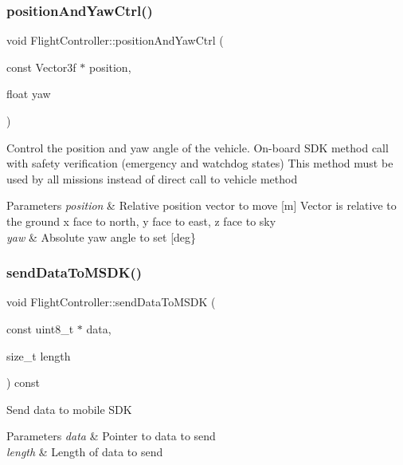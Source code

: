\subsubsection{\texorpdfstring{position\+And\+Yaw\+Ctrl()}{positionAndYawCtrl()}}
{\footnotesize\ttfamily void Flight\+Controller\+::position\+And\+Yaw\+Ctrl (\begin{DoxyParamCaption}\item[{const Vector3f $\ast$}]{position,  }\item[{float}]{yaw }\end{DoxyParamCaption})}

Control the position and yaw angle of the vehicle. On-\/board S\+DK method call with safety verification (emergency and watchdog states) This method must be used by all missions instead of direct call to vehicle method 
\begin{DoxyParams}{Parameters}
{\em position} & Relative position vector to move \mbox{[}m\mbox{]} Vector is relative to the ground x face to north, y face to east, z face to sky \\
\hline
{\em yaw} & Absolute yaw angle to set \mbox{[}deg\} \\
\hline
\end{DoxyParams}
\mbox{\label{class_m210_1_1_flight_controller_aa84f9729545c25d95efdf7d5b58fa635}} 
\subsubsection{\texorpdfstring{send\+Data\+To\+M\+S\+D\+K()}{sendDataToMSDK()}}
{\footnotesize\ttfamily void Flight\+Controller\+::send\+Data\+To\+M\+S\+DK (\begin{DoxyParamCaption}\item[{const uint8\+\_\+t $\ast$}]{data,  }\item[{size\+\_\+t}]{length }\end{DoxyParamCaption}) const}

Send data to mobile S\+DK 
\begin{DoxyParams}{Parameters}
{\em data} & Pointer to data to send \\
\hline
{\em length} & Length of data to send \\
\hline
\end{DoxyParams}
\mbox{\label{class_m210_1_1_flight_controller_ab8249276f7d2079bf8c363d92fec56de}} 
